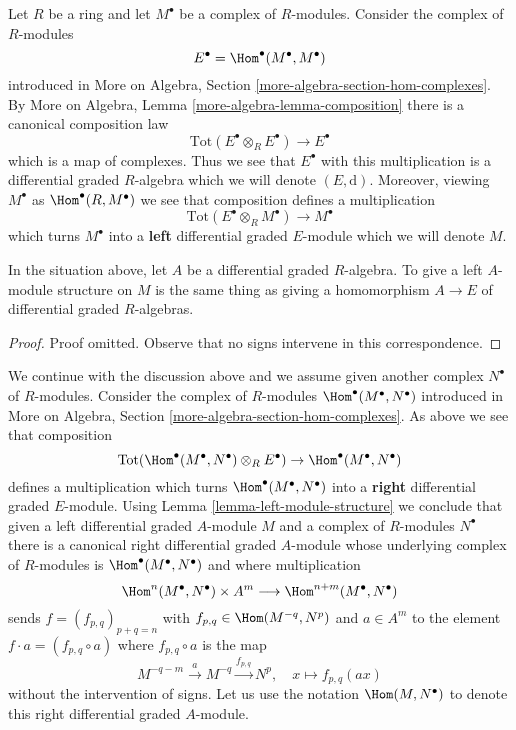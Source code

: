 \medskip\noindent
Let $R$ be a ring and let $M^\bullet$ be a complex of $R$-modules.
Consider the complex of $R$-modules
$$
E^\bullet = \Hom^\bullet(M^\bullet, M^\bullet)
$$
introduced in
More on Algebra, Section \ref{more-algebra-section-hom-complexes}.
By More on Algebra, Lemma \ref{more-algebra-lemma-composition}
there is a canonical composition law
$$
\text{Tot}(E^\bullet \otimes_R E^\bullet) \to E^\bullet
$$
which is a map of complexes. Thus we see that $E^\bullet$ with this
multiplication is a differential graded $R$-algebra which we will
denote $(E, \text{d})$. Moreover, viewing $M^\bullet$ as
$\Hom^\bullet(R, M^\bullet)$ we see that composition defines a multiplication
$$
\text{Tot}(E^\bullet \otimes_R M^\bullet) \to M^\bullet
$$
which turns $M^\bullet$ into a {\bf left} differential graded $E$-module
which we will denote $M$.

\begin{lemma}
\label{lemma-left-module-structure}
In the situation above, let $A$ be a differential graded $R$-algebra.
To give a left $A$-module structure on $M$ is the same thing as
giving a homomorphism $A \to E$ of differential graded $R$-algebras.
\end{lemma}

\begin{proof}
Proof omitted. Observe that no signs intervene in this correspondence.
\end{proof}

\noindent
We continue with the discussion above and we assume given another
complex $N^\bullet$ of $R$-modules. Consider the complex
of $R$-modules $\Hom^\bullet(M^\bullet, N^\bullet)$ introduced in
More on Algebra, Section \ref{more-algebra-section-hom-complexes}.
As above we see that composition
$$
\text{Tot}(\Hom^\bullet(M^\bullet, N^\bullet) \otimes_R E^\bullet)
\to \Hom^\bullet(M^\bullet, N^\bullet)
$$
defines a multiplication which turns $\Hom^\bullet(M^\bullet, N^\bullet)$
into a {\bf right} differential graded $E$-module. Using
Lemma \ref{lemma-left-module-structure} we
conclude that given a left differential graded $A$-module $M$ and
a complex of $R$-modules $N^\bullet$ there is a canonical
right differential graded $A$-module whose underlying complex
of $R$-modules is $\Hom^\bullet(M^\bullet, N^\bullet)$ and
where multiplication
$$
\Hom^n(M^\bullet, N^\bullet) \times A^m \longrightarrow
\Hom^{n + m}(M^\bullet, N^\bullet)
$$
sends $f = (f_{p, q})_{p + q = n}$ with $f_{p, q} \in \Hom(M^{-q}, N^p)$
and $a \in A^m$ to the element $f \cdot a = (f_{p, q} \circ a)$ where
$f_{p, q} \circ a$ is the map
$$
M^{-q - m} \xrightarrow{a} M^{-q} \xrightarrow{f_{p, q}} N^p, \quad
x \longmapsto f_{p, q}(ax)
$$
without the intervention of signs. Let us use the notation
$\Hom(M, N^\bullet)$ to denote this right differential graded $A$-module.

